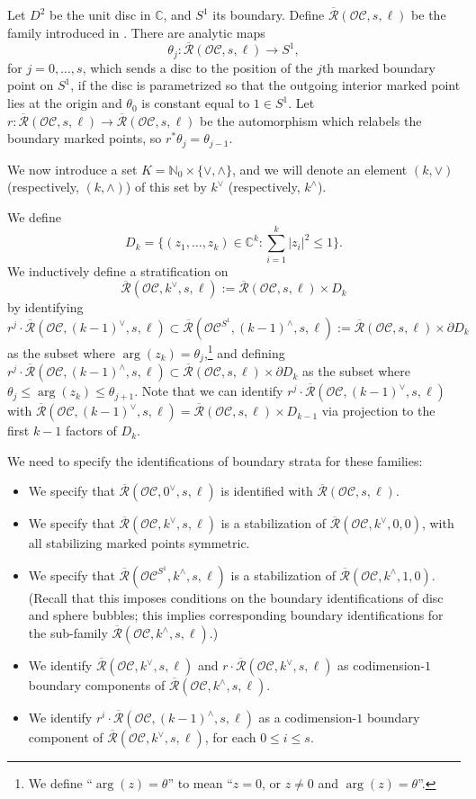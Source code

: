 \documentclass{article}
\def\cO{\mathcal{O}}
\def\cC{\mathcal{C}}
\def\Rbar{\overline{\mathcal{R}}}
\def\C{\mathbb{C}}
\begin{document}
Let $D^2$ be the unit disc in $\C$, and $S^1$ its boundary. 
Define $\Rbar(\cO\cC,s,\ell)$ be the family introduced in \cite[Section 5.5]{relfukii}. 
There are analytic maps 
$$\theta_j: \Rbar(\cO\cC,s,\ell) \to S^1,$$
for $j=0,\ldots,s$, which sends a disc to the position of the $j$th marked boundary point on $S^1$, if the disc is parametrized so that the outgoing interior marked point lies at the origin and $\theta_0$ is constant equal to $1 \in S^1$. Let $r:\Rbar(\cO\cC,s,\ell) \to \Rbar(\cO\cC,s,\ell)$ be the automorphism which relabels the boundary marked points, so $r^*\theta_j = \theta_{j-1}$.

We now introduce a set $K = \mathbb{N}_0 \times \{\vee,\wedge\}$, and we will denote an element $(k,\vee)$ (respectively, $(k,\wedge)$) of this set by $k^\vee$ (respectively, $k^\wedge$).

We define 
$$D_k = \{(z_1,\ldots,z_k) \in \C^k: \sum_{i=1}^k |z_i|^2 \le 1\}.$$
We inductively define a stratification on 
$$\Rbar({\cO\cC},k^\vee,s,\ell) := \Rbar(\cO\cC,s,\ell) \times D_k$$
by identifying 
$$r^j \cdot \Rbar({\cO\cC},(k-1)^\vee,s,\ell) \subset  \Rbar({\cO\cC}^{S^1},(k-1)^\wedge,s,\ell) := \Rbar(\cO\cC,s,\ell) \times \partial D_k$$ 
as the subset where $\arg(z_k) = \theta_j$,\footnote{We define ``$\arg(z) = \theta$'' to mean ``$z=0$, or $z \neq 0$ and $\arg(z) = \theta$''.} and defining $r^j \cdot \Rbar({\cO\cC},(k-1)^\wedge,s,\ell) \subset \Rbar(\cO\cC,s,\ell) \times \partial D_k$ as the subset where $\theta_j \le \arg(z_k) \le \theta_{j+1}$. 
Note that we can identify $r^j \cdot \Rbar({\cO\cC},(k-1)^\vee,s,\ell)$ with $\Rbar({\cO\cC},(k-1)^\vee,s,\ell) = \Rbar(\cO\cC,s,\ell) \times D_{k-1}$ via projection to the first $k-1$ factors of $D_k$.

We need to specify the identifications of boundary strata for these families:
\begin{itemize}
\item We specify that $\Rbar({\cO\cC},0^\vee,s,\ell)$ is identified with $ \Rbar(\cO\cC,s,\ell)$. 
\item We specify that $\Rbar({\cO\cC},k^\vee,s,\ell)$ is a stabilization of $\Rbar({\cO\cC},k^\vee,0,0)$, with all stabilizing marked points symmetric. 
\item We specify that $\Rbar({\cO\cC}^{S^1},k^\wedge,s,\ell)$ is a stabilization of $\Rbar({\cO\cC},k^\wedge,1,0)$. (Recall that this imposes conditions on the boundary identifications of disc and sphere bubbles; this implies corresponding boundary identifications for the sub-family $\Rbar({\cO\cC},k^\wedge,s,\ell)$.) 
\item We identify $\Rbar({\cO\cC},k^\vee,s,\ell)$ and $r \cdot \Rbar({\cO\cC},k^\vee,s,\ell)$ as codimension-$1$ boundary components of $\Rbar({\cO\cC},k^\wedge,s,\ell)$.
\item We identify $r^i \cdot \Rbar({\cO\cC},(k-1)^\wedge,s,\ell)$ as a codimension-$1$ boundary component of $\Rbar({\cO\cC},k^\vee,s,\ell)$, for each $0 \le i \le s$.  
\end{itemize}
\end{document}
